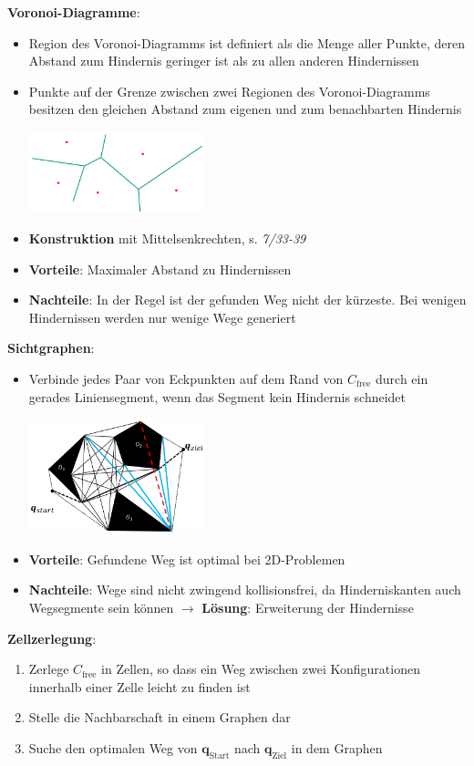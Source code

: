 \textbf{Voronoi-Diagramme}: 
\begin{itemize}
	\item Region des Voronoi-Diagramms ist definiert als die Menge aller Punkte, deren Abstand zum Hindernis geringer ist als zu allen anderen Hindernissen
	\item Punkte auf der Grenze zwischen zwei Regionen des Voronoi-Diagramms besitzen den gleichen Abstand zum eigenen und zum benachbarten Hindernis
	\begin{center}
		\includegraphics[width=0.4\textwidth]{images/voronoi.png}
	\end{center}
	\item \textbf{Konstruktion} mit Mittelsenkrechten, s. \textit{7/33-39}
	\item \textbf{Vorteile}: Maximaler Abstand zu Hindernissen
	\item \textbf{Nachteile}: In der Regel ist der gefunden Weg nicht der kürzeste. Bei wenigen Hindernissen werden nur wenige Wege generiert
\end{itemize}
\bigskip
\textbf{Sichtgraphen}:
\begin{itemize}
	\item Verbinde jedes Paar von Eckpunkten auf dem Rand von $C_\text{free}$ durch ein gerades Liniensegment, wenn das Segment kein Hindernis schneidet
	\begin{center}
		\includegraphics[width=0.4\textwidth]{images/sichtgraph.png}
	\end{center}
	\item \textbf{Vorteile}: Gefundene Weg ist optimal bei 2D-Problemen
	\item \textbf{Nachteile}: Wege sind nicht zwingend kollisionsfrei, da Hinderniskanten auch Wegsegmente sein können $\rightarrow$ \textbf{Lösung}: Erweiterung der Hindernisse
\end{itemize}
\bigskip
\textbf{Zellzerlegung}:
\begin{enumerate}
	\item Zerlege $C_\text{free}$ in Zellen, so dass ein Weg zwischen zwei Konfigurationen innerhalb einer Zelle leicht zu finden ist
	\item Stelle die Nachbarschaft in einem Graphen dar
	\item Suche den optimalen Weg von $\mathbf{q}_\text{Start}$ nach $\mathbf{q}_\text{Ziel}$ in dem Graphen
\end{enumerate}

